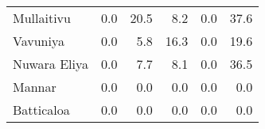 \begin{tabular}{lrrrrr}
Mullaitivu   &         0.0 &        20.5 &          8.2 &              0.0 &        37.6 \\
Vavuniya     &         0.0 &         5.8 &         16.3 &              0.0 &        19.6 \\
Nuwara Eliya &         0.0 &         7.7 &          8.1 &              0.0 &        36.5 \\
Mannar       &         0.0 &         0.0 &          0.0 &              0.0 &         0.0 \\
Batticaloa   &         0.0 &         0.0 &          0.0 &              0.0 &         0.0 \\
\bottomrule
\end{tabular}
